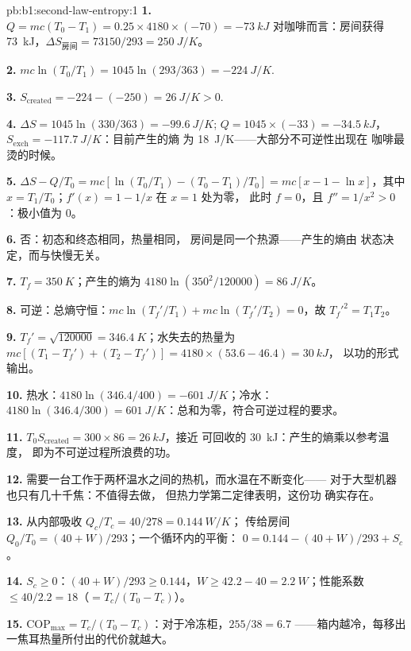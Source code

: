 \begin{solution}{pb:b1:second-law-entropy:1}
\textbf{1.} $Q = mc(T_0 - T_1) = 0.25 \times 4180 \times (-70) = \qty{-73}{kJ}$
对咖啡而言：房间获得 \qty{73}{kJ}，$\Delta S_{\text{房间}} = 73150/293
= \qty{+250}{J/K}$。

\textbf{2.} $mc\ln(T_0/T_1) = 1045\ln(293/363) = \qty{-224}{J/K}$.

\textbf{3.} $S_{\mathrm{created}} = -224 - (-250) = \qty{+26}{J/K} > 0$.

\textbf{4.} $\Delta S = 1045\ln(330/363) = \qty{-99.6}{J/K}$; $Q = 1045 \times
(-33) = \qty{-34.5}{kJ}$，$S_{\mathrm{exch}} = \qty{-117.7}{J/K}$：目前产生的熵
为 \qty{18}{J/K}——大部分不可逆性出现在
咖啡最烫的时候。

\textbf{5.} $\Delta S - Q/T_0 = mc[\ln(T_0/T_1) - (T_0 - T_1)/T_0] = mc[x - 1 -
\ln x]$，其中 $x = T_1/T_0$；$f'(x) = 1 - 1/x$ 在 $x = 1$ 处为零，
此时 $f = 0$，且 $f'' = 1/x^2 > 0$：极小值为 $0$。

\textbf{6.} 否：初态和终态相同，热量相同，
房间是同一个热源——产生的熵由
状态决定，而与快慢无关。

\textbf{7.} $T_f = \qty{350}{K}$；产生的熵为 $4180\ln(350^2/120000) = \qty{86}{J/K}$。

\textbf{8.} 可逆：总熵守恒：$mc\ln(T_f'/T_1) + mc\ln(T_f'/
T_2) = 0$，故 $T_f'^2 = T_1T_2$。

\textbf{9.} $T_f' = \sqrt{120000} = \qty{346.4}{K}$；水失去的热量为 $mc[(T_1 -
T_f') + (T_2 - T_f')] = 4180 \times (53.6 - 46.4) = \qty{30}{kJ}$，
以功的形式输出。

\textbf{10.} 热水：$4180\ln(346.4/400) = \qty{-601}{J/K}$；冷水：$4180\ln(346.4/
300) = \qty{+601}{J/K}$：总和为零，符合可逆过程的要求。

\textbf{11.} $T_0S_{\mathrm{created}} = 300 \times 86 = \qty{26}{kJ}$，接近
可回收的 \qty{30}{kJ}：产生的熵乘以参考温度，
即为不可逆过程所浪费的功。

\textbf{12.} 需要一台工作于两杯温水之间的热机，而水温在不断变化——
对于大型机器也只有几十千焦：不值得去做，
但热力学第二定律表明，这份功
确实存在。

\textbf{13.} 从内部吸收 $Q_c/T_c = 40/278 = \qty{0.144}{W/K}$；
传给房间 $Q_0/T_0 = (40 + W)/293$；一个循环内的平衡：
$0 = 0.144 - (40 + W)/293 + S_c$。

\textbf{14.} $S_c \geq 0$：$(40 + W)/293 \geq 0.144$，$W \geq 42.2 - 40 =
\qty{2.2}{W}$；性能系数 $\leq 40/2.2 = 18$（$= T_c/(T_0 - T_c)$）。

\textbf{15.} $\mathrm{COP}_{\max} = T_c/(T_0 - T_c)$：对于冷冻柜，$255/38 = 6.7$
——箱内越冷，每移出一焦耳热量所付出的代价就越大。


\end{solution}
